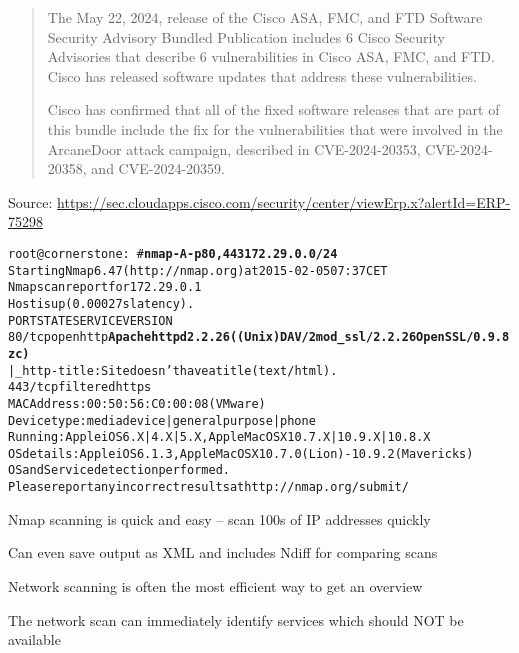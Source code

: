 \documentclass[Screen16to9,17pt]{foils}
\begin{document}


\begin{quote}
The May 22, 2024, release of the Cisco ASA, FMC, and FTD Software Security Advisory Bundled Publication includes 6 Cisco Security Advisories that describe 6 vulnerabilities in Cisco ASA, FMC, and FTD. Cisco has released software updates that address these vulnerabilities.

Cisco has confirmed that all of the fixed software releases that are part of this bundle include the fix for the vulnerabilities that were involved in the ArcaneDoor attack campaign, described in CVE-2024-20353, CVE-2024-20358, and CVE-2024-20359.
\end{quote}
Source: \url{https://sec.cloudapps.cisco.com/security/center/viewErp.x?alertId=ERP-75298}


\begin{alltt}\scriptsize
root@cornerstone:~#{\bfseries nmap -A -p80,443 172.29.0.0/24}
Starting Nmap 6.47 ( http://nmap.org ) at 2015-02-05 07:37 CET
Nmap scan report for 172.29.0.1
Host is up (0.00027s latency).
PORT    STATE    SERVICE VERSION
80/tcp  open     http    {\bf Apache httpd 2.2.26 ((Unix) DAV/2 mod_ssl/2.2.26 OpenSSL/0.9.8zc)}
|_http-title: Site doesn't have a title (text/html).
443/tcp filtered https
MAC Address: 00:50:56:C0:00:08 (VMware)
Device type: media device|general purpose|phone
Running: Apple iOS 6.X|4.X|5.X, Apple Mac OS X 10.7.X|10.9.X|10.8.X
OS details: Apple iOS 6.1.3, Apple Mac OS X 10.7.0 (Lion) - 10.9.2 (Mavericks)
OS and Service detection performed.
Please report any incorrect results at http://nmap.org/submit/
\end{alltt}

\begin{list2}
\item Nmap scanning is quick and easy -- scan 100s of IP addresses quickly
\item Can even save output as XML and includes Ndiff for comparing scans
\item Network scanning is often the most efficient way to get an overview
\item The network scan can immediately identify services which should NOT be available
\end{list2}


\end{document}
